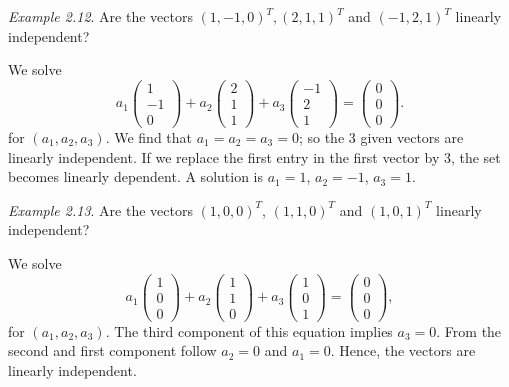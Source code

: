 \documentclass[
  letterpaper,
  DIV=11,
  numbers=noendperiod]{scrartcl}
\theoremstyle{remark}
\begin{document}
\emph{Example 2.12}. Are the vectors \((1,-1,0)^{T},(2,1,1)^{T}\) and
\((-1,2,1)^{T}\) linearly independent?

We solve \[a_{1} \begin{pmatrix}   
1 \\ 
-1 \\ 
0  \end{pmatrix} +a_{2}  \begin{pmatrix}   
2 \\ 
1 \\ 
1  \end{pmatrix} +a_{3}  \begin{pmatrix}   
-1 \\ 
2 \\ 
1  \end{pmatrix} = \begin{pmatrix}   
0 \\ 
0 \\ 
0  \end{pmatrix}.\] for \((a_{1}, a_{2}, a_{3})\). We find that
\(a_{1}=a_{2}=a_{3}=0\); so the 3 given vectors are linearly
independent. If we replace the first entry in the first vector by 3, the
set becomes linearly dependent. A solution is \(a_1=1\), \(a_2=-1\),
\(a_3=1\).

\emph{Example 2.13}. Are the vectors \((1,0,0)^{T}\), \((1,1,0)^{T}\)
and \((1,0,1)^{T}\) linearly independent?

We solve
\[a_{1} \scriptstyle \begin{pmatrix}   1 \\ 0 \\ 0  \end{pmatrix} \textstyle + a_{2} \scriptstyle \begin{pmatrix}   1 \\ 1 \\ 0  \end{pmatrix} \textstyle + a_{3} \scriptstyle \begin{pmatrix}   1 \\ 0 \\ 1  \end{pmatrix} \textstyle = \scriptstyle \begin{pmatrix}   0\\0\\0  \end{pmatrix} \textstyle,\]
for \((a_{1},a_{2},a_{3})\). The third component of this equation
implies \(a_{3}=0\). From the second and first component follow
\(a_{2}=0\) and \(a_{1} =0\). Hence, the vectors are linearly
independent.
\end{document}
